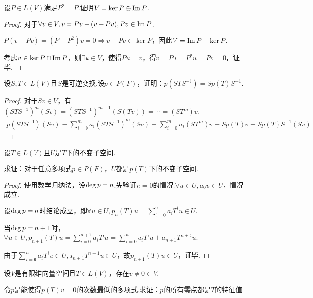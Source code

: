\begin{problem}[4]\label{5.B.4}
    设\(P \in L(V)\)满足\(P^2=P\).证明\(V=\ker P \oplus \operatorname{Im} P\).
\end{problem}

\begin{proof}
    对于\(\forall v \in V,v=Pv+(v-Pv),Pv \in \operatorname{Im} P\).

    \(P(v-Pv)=(P-P^2)v=0 \Rightarrow v-Pv \in \ker P\)，因此\(V=\operatorname{Im} P+\ker P\).
    
    考虑\(v \in \ker P \cap \operatorname{Im} P\)，则\(\exists u \in V\)，使得\(Pu=v\)，得\(v=Pu=P^2u=Pv=0\)，证毕.
\end{proof}

\begin{problem}[5]\label{5.B.5}
    设\(S,T \in L(V)\)且\(S\)是可逆变换.设\(p \in P(F)\)，证明：\(p(STS^{-1})=Sp(T)S^{-1}\).
\end{problem}

\begin{proof}
    对于\(Sv \in V\)，有\((STS^{-1})^m (Sv)=(STS^{-1})^{m-1}(S(Tv))=\cdots=(ST^m)v\).
    \begin{align*}
        p(STS^{-1})(Sv)=\sum_{i=0}^m a_i(STS^{-1})^m (Sv) 
        =\sum_{i=0}^m a_i(ST^m)v=Sp(T)v=Sp(T)S^{-1}(Sv)
    \end{align*}
\end{proof}

\newpage

\begin{problem}[6]\label{5.B.6}
    设\(T \in L(V)\)且\(U\)是\(T\)下的不变子空间.

    求证：对于任意多项式\(p \in P(F)\)，\(U\)都是\(p(T)\)下的不变子空间.
\end{problem}

\begin{proof}
    使用数学归纳法，设\(\operatorname{deg} p=n\).先验证\(n=0\)的情况.\(\forall u \in U,a_0u \in U\)，情况成立.
    
    设\(\operatorname{deg} p=n\)时结论成立，即\(\forall u \in U,p_n(T)u=\sum_{i=0}^n a_iT^iu \in U\).
    
    当\(\operatorname{deg} p=n+1\)时，\(\forall u \in U,p_{n+1}(T)u=\sum_{i=0}^{n+1} a_iT^iu=\sum_{i=0}^n a_iT^iu+a_{n+1}T^{n+1}u\).
    
    由于\(\sum_{i=0}^n a_iT^iu \in U,a_{n+1}T^{n+1}u \in U\)，故\(p_{n+1}(T)u \in U\)，证毕.
\end{proof}

\begin{problem}[9]\label{5.B.9}
    设\(V\)是有限维向量空间且\(T \in L(V)\)，存在\(v \ne 0 \in V\).

    令\(p\)是能使得\(p(T)v=0\)的次数最低的多项式.求证：\(p\)的所有零点都是\(T\)的特征值.
\end{problem}

